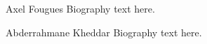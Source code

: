 \documentclass[10pt,journal,compsoc]{IEEEtran}
\begin{document}


% 

\begin{IEEEbiography}{Axel Fougues}
Biography text here.
\end{IEEEbiography}

\begin{IEEEbiography}{Abderrahmane Kheddar}
Biography text here.
\end{IEEEbiography}






\end{document}
